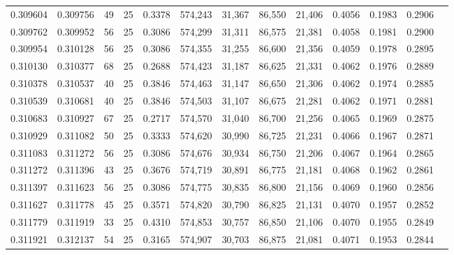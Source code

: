 \begin{tabular}{rrrrrrrrrrrrr}
0.309604 & 0.309756 &    49 &  25 &                                     0.3378 & 574,243 &  31,367 &  86,550 &  21,406 & 0.4056 & 0.1983 & 0.2906 \\
0.309762 & 0.309952 &    56 &  25 &                                     0.3086 & 574,299 &  31,311 &  86,575 &  21,381 & 0.4058 & 0.1981 & 0.2900 \\
0.309954 & 0.310128 &    56 &  25 &                                     0.3086 & 574,355 &  31,255 &  86,600 &  21,356 & 0.4059 & 0.1978 & 0.2895 \\
0.310130 & 0.310377 &    68 &  25 &                                     0.2688 & 574,423 &  31,187 &  86,625 &  21,331 & 0.4062 & 0.1976 & 0.2889 \\
0.310378 & 0.310537 &    40 &  25 &                                     0.3846 & 574,463 &  31,147 &  86,650 &  21,306 & 0.4062 & 0.1974 & 0.2885 \\
0.310539 & 0.310681 &    40 &  25 &                                     0.3846 & 574,503 &  31,107 &  86,675 &  21,281 & 0.4062 & 0.1971 & 0.2881 \\
0.310683 & 0.310927 &    67 &  25 &                                     0.2717 & 574,570 &  31,040 &  86,700 &  21,256 & 0.4065 & 0.1969 & 0.2875 \\
0.310929 & 0.311082 &    50 &  25 &                                     0.3333 & 574,620 &  30,990 &  86,725 &  21,231 & 0.4066 & 0.1967 & 0.2871 \\
0.311083 & 0.311272 &    56 &  25 &                                     0.3086 & 574,676 &  30,934 &  86,750 &  21,206 & 0.4067 & 0.1964 & 0.2865 \\
0.311272 & 0.311396 &    43 &  25 &                                     0.3676 & 574,719 &  30,891 &  86,775 &  21,181 & 0.4068 & 0.1962 & 0.2861 \\
0.311397 & 0.311623 &    56 &  25 &                                     0.3086 & 574,775 &  30,835 &  86,800 &  21,156 & 0.4069 & 0.1960 & 0.2856 \\
0.311627 & 0.311778 &    45 &  25 &                                     0.3571 & 574,820 &  30,790 &  86,825 &  21,131 & 0.4070 & 0.1957 & 0.2852 \\
0.311779 & 0.311919 &    33 &  25 &                                     0.4310 & 574,853 &  30,757 &  86,850 &  21,106 & 0.4070 & 0.1955 & 0.2849 \\
0.311921 & 0.312137 &    54 &  25 &                                     0.3165 & 574,907 &  30,703 &  86,875 &  21,081 & 0.4071 & 0.1953 & 0.2844 \\

\end{tabular}
